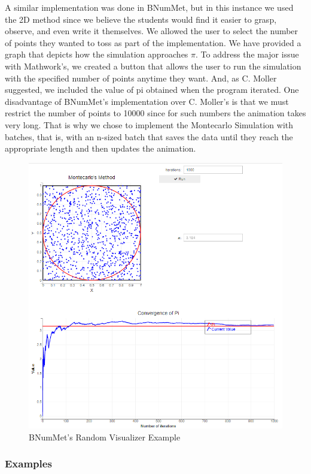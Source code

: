 A similar implementation was done in BNumMet, but in this instance we used the 2D method since we believe the students would find it easier to grasp, observe, and even write it themselves. We allowed the user to select the number of points they wanted to toss as part of the implementation. We have provided a graph that depicts how the simulation approaches $\pi$. To address the major issue with Mathwork's, we created a button that allows the user to run the simulation with the specified number of points anytime they want. And, as C. Moller suggested, we included the value of pi obtained when the program iterated. One disadvantage of BNumMet's implementation over C. Moller's is that we must restrict the number of points to 10000 since for such numbers the animation takes very long. That is why we chose to implement the Montecarlo Simulation with batches, that is, with an n-sized batch that saves the data until they reach the appropriate length and then updates the animation.
\begin{figure}[H]
    \centering
    \includegraphics[width=\textwidth]{Include/Images/Thesis/Development/Visualizers/RANDOMNESS/BNumMet.Random.Ex1.png}
    \caption{BNumMet's Random Visualizer Example}
    \label{fig:BNumMet's Random Visualizer Example}
\end{figure}
\subsubsection{Examples}
	
